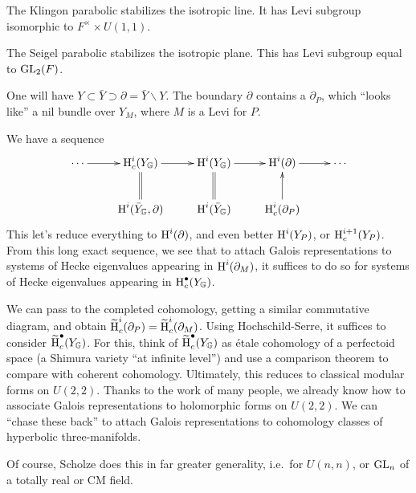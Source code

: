 The Klingon parabolic stabilizes the isotropic line. It has Levi subgroup 
isomorphic to $F^\times \times U(1,1)$. 

The Seigel parabolic stabilizes the isotropic plane. This has Levi subgroup 
equal to $\operatorname{GL}_2(F)$. 

One will have $Y\subset \bar Y\supset\partial = \bar Y\smallsetminus Y$. 
The boundary $\partial $ contains a $\partial_P$, which ``looks like'' a nil bundle 
over $Y_M$, where $M$ is a Levi for $P$. 

We have a sequence 
\[\xymatrix{
  \cdots \ar[r] 
    & \h_c^i(Y_\dG) \ar[r] \ar@{=}[d] 
    & \h^i(Y_\dG) \ar[r] \ar@{=}[d] 
    & \h^i(\partial) \ar[r] 
    & \cdots \\
  & \h^i(\bar Y_\dG,\partial) 
  & \h^i(\bar Y_\dG) 
  & \h_c^i(\partial_P) \ar[u] 
}\]
This let's reduce everything to $\operatorname{H}^i(\partial)$, and even better 
$\operatorname{H}^i(Y_P)$, or $\operatorname{H}_c^{i+1}(Y_P)$. From this long exact sequence, we see that 
to attach Galois representations to systems of Hecke eigenvalues appearing in 
$\operatorname{H}^i(\partial_M)$, it suffices to do so for systems of Hecke eigenvalues 
appearing in $\operatorname{H}^\bullet_c(Y_{\mathbb{G}})$. 

We can pass to the completed cohomology, getting a similar commutative 
diagram, and obtain $\widetilde {\operatorname{H}}_c^i(\partial_P)=\widetilde {\operatorname{H}}_c^i(\partial_M)$. 
Using Hochschild-Serre, it suffices to consider 
$\widetilde {\operatorname{H}}_c^\bullet(Y_{\mathbb{G}})$. For this, think of 
$\widetilde{\operatorname{H}}_c^\bullet(Y_{\mathbb{G}})$ as \'etale cohomology of a perfectoid space (a 
Shimura variety ``at infinite level'') and use a comparison theorem to compare 
with coherent cohomology. Ultimately, this reduces to classical modular forms 
on $U(2,2)$. Thanks to the work of many people, we already know how to 
associate Galois representations to holomorphic forms on $U(2,2)$. We can 
``chase these back'' to attach Galois representations to cohomology classes of 
hyperbolic three-manifolds. 

Of course, Scholze does this in far greater generality, i.e.\ for 
$U(n,n)$, or $\operatorname{GL}_n$ of a totally real or CM field. 









